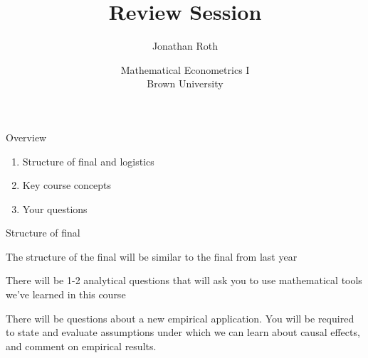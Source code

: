 \documentclass[11pt,english,handout]{beamer}
\newenvironment{wideitemize}{\itemize\addtolength{\itemsep}{10pt}}{\enditemize}
\begin{document}
	
	\begin{frame}[noframenumbering]{}
		\vspace{0.5cm}
		\title[]{Review Session}
		\author{Jonathan Roth}
		\date{Mathematical Econometrics I \\ Brown University\\} 
		\titlepage {\small{}\ }\thispagestyle{empty} \vspace{-30pt}
		
	\end{frame}


\begin{frame}{Overview}
	\begin{enumerate}
		\item 
		Structure of final and logistics
		
		\item
		Key course concepts
		
		\item
		Your questions
	\end{enumerate}
\end{frame}
	
	
\begin{frame}{Structure of final}
	\begin{wideitemize}
		\item
		The structure of the final will be similar to the final from last year
		
		\item
		There will be 1-2 analytical questions that will ask you to use mathematical tools we've learned in this course
		
		\item
		There will be questions about a new empirical application. You will be required to state and evaluate assumptions under which we can learn about causal effects, and comment on empirical results.
		
	\end{wideitemize}
\end{frame}	
\end{document}
